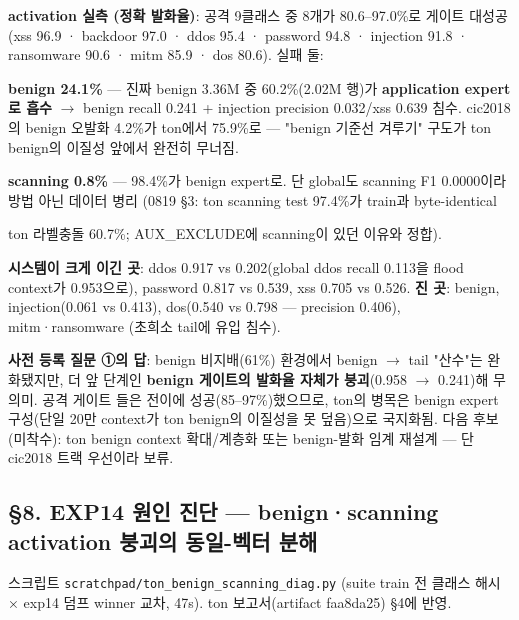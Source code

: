 \textbf{activation 실측 (정확 발화율)}: 공격 9클래스 중 8개가 80.6–97.0\%로 게이트 대성공 (xss 96.9 · backdoor 97.0 · ddos 95.4 · password 94.8 · injection 91.8 · ransomware 90.6 · mitm 85.9 · dos 80.6). 실패 둘:

\par\noindent \textbullet\enspace \textbf{benign 24.1\%} — 진짜 benign 3.36M 중 60.2\%(2.02M 행)가 \textbf{application expert로 흡수}  \ensuremath{\rightarrow}  benign recall 0.241 +\allowbreak{} injection precision 0.032/\allowbreak{}xss 0.639 침수. cic2018의 benign 오발화 4.2\%가 ton에서 75.9\%로 — "benign 기준선 겨루기" 구도가 ton benign의 이질성 앞에서 완전히 무너짐.


\par\noindent \textbullet\enspace \textbf{scanning 0.8\%} — 98.4\%가 benign expert로. 단 global도 scanning F1 0.0000이라 방법 아닌 데이터 병리 (0819 §3: ton scanning test 97.4\%가 train과 byte-identical

\par\noindent \textbullet\enspace ton 라벨충돌 60.7\%; AUX\_\allowbreak{}EXCLUDE에 scanning이 있던 이유와 정합).



\textbf{시스템이 크게 이긴 곳}: ddos 0.917 vs 0.202(global ddos recall 0.113을 flood context가 0.953으로), password 0.817 vs 0.539, xss 0.705 vs 0.526. \textbf{진 곳}: benign, injection(0.061 vs 0.413), dos(0.540 vs 0.798 — precision 0.406), mitm·ransomware (초희소 tail에 유입 침수).

\textbf{사전 등록 질문 ①의 답}: benign 비지배(61\%) 환경에서 benign \ensuremath{\rightarrow} tail "산수"는 완화됐지만, 더 앞 단계인 \textbf{benign 게이트의 발화율 자체가 붕괴}(0.958 \ensuremath{\rightarrow} 0.241)해 무의미. 공격 게이트 들은 전이에 성공(85–97\%)했으므로, ton의 병목은 benign expert 구성(단일 20만 context가 ton benign의 이질성을 못 덮음)으로 국지화됨. 다음 후보(미착수): ton benign context 확대/\allowbreak{}계층화 또는 benign-발화 임계 재설계 — 단 cic2018 트랙 우선이라 보류.

\subsection{§8. EXP14 원인 진단 — benign·scanning activation 붕괴의 동일-벡터 분해}
스크립트 \texttt{scratchp\allowbreak{}ad/\allowbreak{}\allowbreak{}ton\_\allowbreak{}\allowbreak{}b\allowbreak{}enign\_\allowbreak{}\allowbreak{}sc\allowbreak{}anning\_\allowbreak{}\allowbreak{}d\allowbreak{}iag.\allowbreak{}py} (suite train 전 클래스 해시 × exp14 덤프 winner 교차, 47s). ton 보고서(artifact faa8da25) §4에 반영.

